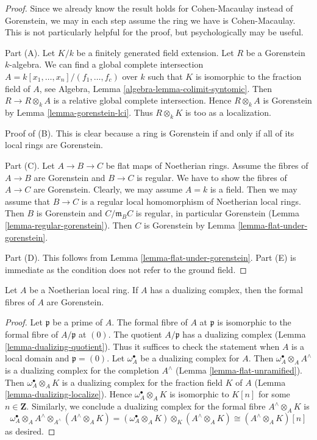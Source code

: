 \begin{proof}
Since we already know the result holds for Cohen-Macaulay instead
of Gorenstein, we may in each step assume the ring we have is
Cohen-Macaulay. This is not particularly helpful for the proof, but
psychologically may be useful.

\medskip\noindent
Part (A). Let $K/k$ be a finitely generated field extension.
Let $R$ be a Gorenstein $k$-algebra.
We can find a global complete intersection
$A = k[x_1, \ldots, x_n]/(f_1, \ldots, f_c)$
over $k$ such that $K$ is isomorphic to the fraction field of $A$, see
Algebra, Lemma \ref{algebra-lemma-colimit-syntomic}.
Then $R \to R \otimes_k A$ is a relative global complete intersection.
Hence $R \otimes_k A$ is Gorenstein by Lemma \ref{lemma-gorenstein-lci}.
Thus $R \otimes_k K$ is too as a localization.

\medskip\noindent
Proof of (B). This is clear because a ring is Gorenstein
if and only if all of its local rings are Gorenstein.

\medskip\noindent
Part (C). Let $A \to B \to C$ be flat maps of Noetherian rings.
Assume the fibres of $A \to B$ are Gorenstein and $B \to C$ is regular.
We have to show the fibres of $A \to C$ are Gorenstein.
Clearly, we may assume $A = k$ is a field. Then we may assume that
$B \to C$ is a regular local homomorphism of Noetherian local rings.
Then $B$ is Gorenstein and $C/\mathfrak m_B C$ is regular, in
particular Gorenstein (Lemma \ref{lemma-regular-gorenstein}).
Then $C$ is Gorenstein by
Lemma \ref{lemma-flat-under-gorenstein}.

\medskip\noindent
Part (D). This follows from Lemma \ref{lemma-flat-under-gorenstein}.
Part (E) is immediate as the condition does not refer to the ground field.
\end{proof}

\begin{lemma}
\label{lemma-dualizing-gorenstein-formal-fibres}
Let $A$ be a Noetherian local ring. If $A$ has a dualizing complex,
then the formal fibres of $A$ are Gorenstein.
\end{lemma}

\begin{proof}
Let $\mathfrak p$ be a prime of $A$. The formal fibre of $A$ at $\mathfrak p$
is isomorphic to the formal fibre of $A/\mathfrak p$ at $(0)$. The quotient
$A/\mathfrak p$ has a dualizing complex
(Lemma \ref{lemma-dualizing-quotient}).
Thus it suffices to check the statement
when $A$ is a local domain and $\mathfrak p = (0)$.
Let $\omega_A^\bullet$ be a dualizing complex for $A$. Then
$\omega_A^\bullet \otimes_A A^\wedge$ is a dualizing complex
for the completion $A^\wedge$
(Lemma \ref{lemma-flat-unramified}).
Then $\omega_A^\bullet \otimes_A K$ is a dualizing
complex for the fraction field $K$ of $A$
(Lemma \ref{lemma-dualizing-localize}).
Hence $\omega_A^\bullet \otimes_A K$
is isomorphic to $K[n]$ for some $n \in \mathbf{Z}$.
Similarly, we conclude a dualizing complex for the formal fibre
$A^\wedge \otimes_A K$ is
$$
\omega_A^\bullet \otimes_A A^\wedge \otimes_{A^\wedge} (A^\wedge \otimes_A K) =
(\omega_A^\bullet \otimes_A K) \otimes_K (A^\wedge \otimes_A K) \cong
(A^\wedge \otimes_A K)[n]
$$
as desired.
\end{proof}


